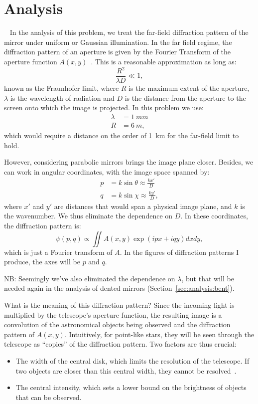 \documentclass[11pt]{article}
\begin{document}
\section{Analysis}~\label{sec:analysis}
In the analysis of this problem, we treat the far-field diffraction pattern of the mirror under uniform or Gaussian illumination. In the far field regime, the diffraction pattern of an aperture is given by the Fourier Transform of the aperture function \( A(x,y) \)~\cite[Chapter 10.2]{hecht}. This is a reasonable approximation as long as:
\begin{equation}\label{eqn:fraunhofer}
    \frac{R^2}{\lambda D} \ll 1,
\end{equation}
known as the Fraunhofer limit, where $R$ is the maximum extent of the aperture, $\lambda$ is the wavelength of radiation and $D$ is the distance from the aperture to the screen onto which the image is projected. In this problem we use:
\begin{align*}
    \lambda &= \SI{1}{mm} \\
    R &= \SI{6}{m},
\end{align*}
which would require a distance on the order of \SI{1}{km} for the far-field limit to hold. 

However, considering parabolic mirrors brings the image plane closer. Besides, we can work in angular coordinates, with the image space spanned by:
\begin{align*}
    p &= k \sin{\theta} \approx \frac{k x'}{D} \\
    q &= k \sin{\chi} \approx \frac{k y'}{D},
\end{align*}
where $x'$ and $y'$ are distances that would span a physical image plane, and $k$ is the wavenumber. We thus eliminate the dependence on $D$. In these coordinates, the diffraction pattern is:
\begin{equation}\label{eqn:diff}
    \psi(p, q) \propto \iint A(x, y) \exp \left( ipx + iqy \right) dx dy,
\end{equation}
which is just a Fourier transform of $A$. In the figures of diffraction patterns I produce, the axes will be $p$ and $q$.

NB: Seemingly we've also eliminated the dependence on $\lambda$, but that will be needed again in the analysis of dented mirrors (Section~\ref{sec:analysis:bent}).

What is the meaning of this diffraction pattern? Since the incoming light is multiplied by the telescope's aperture function, the resulting image is a convolution of the astronomical objects being observed and the diffraction pattern of $A(x, y)$. Intuitively, for point-like stars, they will be seen through the telescope as ``copies'' of the diffraction pattern. Two factors are thus crucial:
\begin{itemize}
    \item The width of the central disk, which limits the resolution of the telescope. If two objects are closer than this central width, they cannot be resolved~\cite[Section~10.2.6]{hecht}.
    \item The central intensity, which sets a lower bound on the brightness of objects that can be observed.
\end{itemize}
\end{document}
